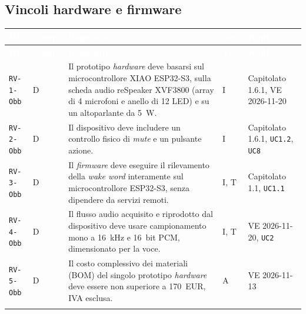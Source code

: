 \documentclass[12pt,a4paper]{article}
\newcommand{\thc}[1]{\textcolor{white}{\textbf{#1}}}
\newcommand{\rl}{\\ \arrayrulecolor{bfline}\hline}
\begin{document}
\subsection{Vincoli hardware e firmware}
\begin{longtable}{>{\raggedright\arraybackslash}p{}>{\centering\arraybackslash}p{}>{\raggedright\arraybackslash}p{}>{\centering\arraybackslash}p{}>{\raggedright\arraybackslash}p{}}
\rowcolor{bfblue}\thc{ID} & \thc{Comp.} & \thc{Requisito} & \thc{Ver.} & \thc{Fonti} \\ \endfirsthead
\rowcolor{bfblue}\thc{ID} & \thc{Comp.} & \thc{Requisito} & \thc{Ver.} & \thc{Fonti} \\ \endhead
\texttt{RV-1-Obb} & D & Il prototipo \emph{hardware} deve basarsi sul microcontrollore XIAO ESP32-S3, sulla scheda audio reSpeaker XVF3800 (array di 4 microfoni e anello di 12 LED) e su un altoparlante da 5~W. & I & Capitolato 1.6.1, VE 2026-11-20 \rl

\texttt{RV-2-Obb} & D & Il dispositivo deve includere un controllo fisico di \emph{mute} e un pulsante azione. & I & Capitolato 1.6.1, \texttt{UC1.2}, \texttt{UC8} \rl

\texttt{RV-3-Obb} & D & Il \emph{firmware} deve eseguire il rilevamento della \emph{wake word} interamente sul microcontrollore ESP32-S3, senza dipendere da servizi remoti. & I, T & Capitolato 1.1, \texttt{UC1.1} \rl

\texttt{RV-4-Obb} & D & Il flusso audio acquisito e riprodotto dal dispositivo deve usare campionamento mono a 16~kHz e 16~bit PCM, dimensionato per la voce. & I, T & VE 2026-11-20, \texttt{UC2} \rl

\texttt{RV-5-Obb} & D & Il costo complessivo dei materiali (BOM) del singolo prototipo \emph{hardware} deve essere non superiore a 170~EUR, IVA esclusa. & A & VE 2026-11-13 \rl

\end{longtable}
\end{document}
